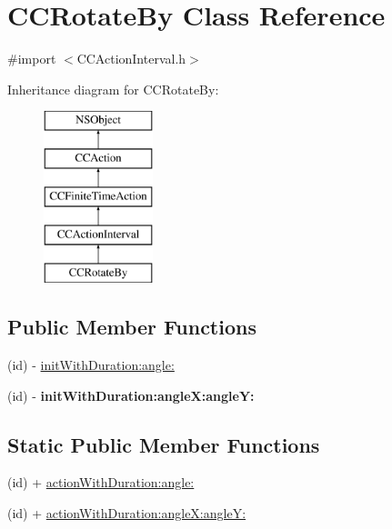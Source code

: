 \hypertarget{interface_c_c_rotate_by}{\section{C\-C\-Rotate\-By Class Reference}
\label{interface_c_c_rotate_by}
}


{\ttfamily \#import $<$C\-C\-Action\-Interval.\-h$>$}

Inheritance diagram for C\-C\-Rotate\-By\-:\begin{figure}[H]
\begin{center}
\leavevmode
\includegraphics[height=5.000000cm]{interface_c_c_rotate_by}
\end{center}
\end{figure}
\subsection*{Public Member Functions}
\begin{DoxyCompactItemize}
\item 
(id) -\/ \hyperlink{interface_c_c_rotate_by_a17b26d5a37d69ec65637dd1f9e3ce4ee}{init\-With\-Duration\-:angle\-:}
\item 
\hypertarget{interface_c_c_rotate_by_ae6c82984fbed85ce48b7630f90b5dfdd}{(id) -\/ {\bfseries init\-With\-Duration\-:angle\-X\-:angle\-Y\-:}}\label{interface_c_c_rotate_by_ae6c82984fbed85ce48b7630f90b5dfdd}

\end{DoxyCompactItemize}
\subsection*{Static Public Member Functions}
\begin{DoxyCompactItemize}
\item 
(id) + \hyperlink{interface_c_c_rotate_by_ab4920ed13e27b365e713174ff10a258a}{action\-With\-Duration\-:angle\-:}
\item 
(id) + \hyperlink{interface_c_c_rotate_by_aaa57d6a30ed8b2ab1609fd9a66d5985a}{action\-With\-Duration\-:angle\-X\-:angle\-Y\-:}
\end{DoxyCompactItemize}
